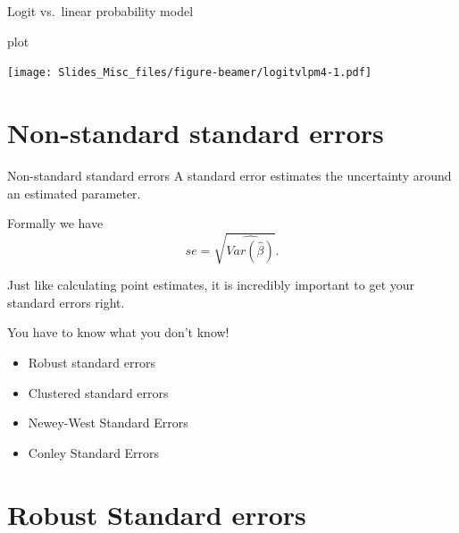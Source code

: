 \documentclass[
  ignorenonframetext,
]{beamer}
\newenvironment{Shaded}{\begin{snugshade}}{\end{snugshade}}
\newcommand{\NormalTok}[1]{#1}
\begin{document}
\begin{frame}[fragile]{Logit vs.~linear probability model}
\protect\hypertarget{logit-vs.-linear-probability-model-4}{}
\begin{Shaded}
\begin{Highlighting}[]
\NormalTok{plot}
\end{Highlighting}
\end{Shaded}

\texttt{[image: Slides\_Misc\_files/figure-beamer/logitvlpm4-1.pdf]}
\end{frame}

\hypertarget{non-standard-standard-errors}{%
\section{Non-standard standard
errors}\label{non-standard-standard-errors}}

\begin{frame}{Non-standard standard errors}
\protect\hypertarget{non-standard-standard-errors-1}{}
A standard error estimates the uncertainty around an estimated
parameter.

Formally we have \[
se=\sqrt{\widehat{Var(\hat{\beta})}}. 
\]

Just like calculating point estimates, it is incredibly important to get
your standard errors right.

You have to know what you don't know!

\begin{itemize}
\item
  Robust standard errors
\item
  Clustered standard errors
\item
  Newey-West Standard Errors
\item
  Conley Standard Errors
\end{itemize}
\end{frame}

\hypertarget{robust-standard-errors}{%
\section{Robust Standard errors}\label{robust-standard-errors}}
\end{document}
